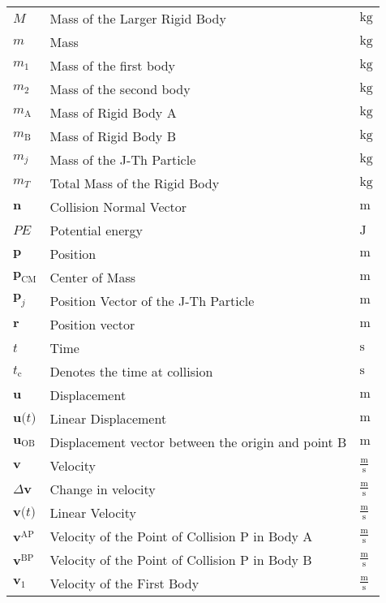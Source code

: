 \documentclass[12pt]{article}
\begin{document}
\begin{longtabu}{l X[l] l}
\\
$M$ & Mass of the Larger Rigid Body & ${\text{kg}}$
\\
$m$ & Mass & ${\text{kg}}$
\\
${m_{1}}$ & Mass of the first body & ${\text{kg}}$
\\
${m_{2}}$ & Mass of the second body & ${\text{kg}}$
\\
${m_{\text{A}}}$ & Mass of Rigid Body A & ${\text{kg}}$
\\
${m_{\text{B}}}$ & Mass of Rigid Body B & ${\text{kg}}$
\\
${m_{j}}$ & Mass of the J-Th Particle & ${\text{kg}}$
\\
${m_{T}}$ & Total Mass of the Rigid Body & ${\text{kg}}$
\\
$\mathbf{n}$ & Collision Normal Vector & ${\text{m}}$
\\
$PE$ & Potential energy & ${\text{J}}$
\\
$\mathbf{p}$ & Position & ${\text{m}}$
\\
${\mathbf{p}_{\text{CM}}}$ & Center of Mass & ${\text{m}}$
\\
${\mathbf{p}_{j}}$ & Position Vector of the J-Th Particle & ${\text{m}}$
\\
$\mathbf{r}$ & Position vector & ${\text{m}}$
\\
$t$ & Time & ${\text{s}}$
\\
${t_{\text{c}}}$ & Denotes the time at collision & ${\text{s}}$
\\
$\mathbf{u}$ & Displacement & ${\text{m}}$
\\
$\mathbf{u}\text{(}t\text{)}$ & Linear Displacement & ${\text{m}}$
\\
${\mathbf{u}_{\text{O}\text{B}}}$ & Displacement vector between the origin and point B & ${\text{m}}$
\\
$\mathbf{v}$ & Velocity & $\frac{\text{m}}{\text{s}}$
\\
$Δ\mathbf{v}$ & Change in velocity & $\frac{\text{m}}{\text{s}}$
\\
$\mathbf{v}\text{(}t\text{)}$ & Linear Velocity & $\frac{\text{m}}{\text{s}}$
\\
${\mathbf{v}^{\text{A}\text{P}}}$ & Velocity of the Point of Collision P in Body A & $\frac{\text{m}}{\text{s}}$
\\
${\mathbf{v}^{\text{B}\text{P}}}$ & Velocity of the Point of Collision P in Body B & $\frac{\text{m}}{\text{s}}$
\\
${\mathbf{v}_{1}}$ & Velocity of the First Body & $\frac{\text{m}}{\text{s}}$
\\

\end{longtabu}
\end{document}

